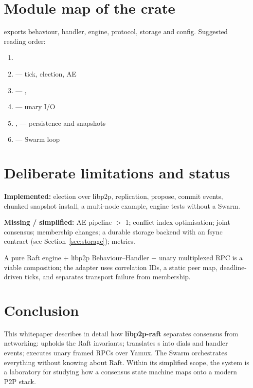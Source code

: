 

\section{Module map of the crate}

 exports behaviour, handler, engine, protocol, storage and config. Suggested reading order:
\begin{enumerate}[label=\arabic*., nosep]
  \item {}
  \item {} --- tick, election, AE
  \item {} --- , 
  \item {} --- unary I/O
  \item {},  --- persistence and snapshots
  \item {} --- Swarm loop
\end{enumerate}

\section{Deliberate limitations and status}

\textbf{Implemented:} election over libp2p, replication, propose, commit events, chunked snapshot install, a multi-node example, engine tests without a Swarm.

\textbf{Missing / simplified:} AE pipeline $>$ 1; conflict-index optimisation; joint consensus; membership changes; a durable storage backend with an fsync contract (see Section~\ref{sec:storage}); metrics.

\begin{invariantbox}
A pure Raft engine + libp2p Behaviour--Handler + unary multiplexed RPC is a viable composition; the adapter uses correlation IDs, a static peer map, deadline-driven ticks, and separates transport failure from membership.
\end{invariantbox}

\section{Conclusion}

This whitepaper describes in detail how \textbf{libp2p-raft} separates consensus from networking:  upholds the Raft invariants;  translates s into dials and handler events;  executes unary framed RPCs over Yamux. The Swarm orchestrates everything without knowing about Raft. Within its simplified scope, the system is a laboratory for studying how a consensus state machine maps onto a modern P2P stack.
